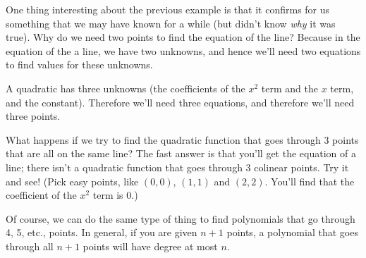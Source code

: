 \medskip

One thing interesting about the previous example is that it confirms for us something that we may have known for a while (but didn't know \textit{why} it was true). Why do we need two points to find the equation of the line? Because in the equation of the a line, we have two unknowns, and hence we'll need two equations to find values for these unknowns.


A quadratic has three unknowns (the coefficients of the $x^2$ term and the $x$ term, and the constant). Therefore we'll need three equations, and therefore we'll need three points. 

What happens if we try to find the quadratic function that goes through 3 points that are all on the same line? The fast answer is that you'll get the equation of a line; there isn't a quadratic function that goes through 3 colinear points. Try it and see! (Pick easy points, like $(0,0)$, $(1,1)$ and $(2,2)$. You'll find that the coefficient of the $x^2$ term is 0.)

Of course, we can do the same type of thing to find polynomials that go through 4, 5, etc., points. In general, if you are given $n+1$ points, a polynomial that goes through all $n+1$ points will have degree at most $n$.

\medskip


